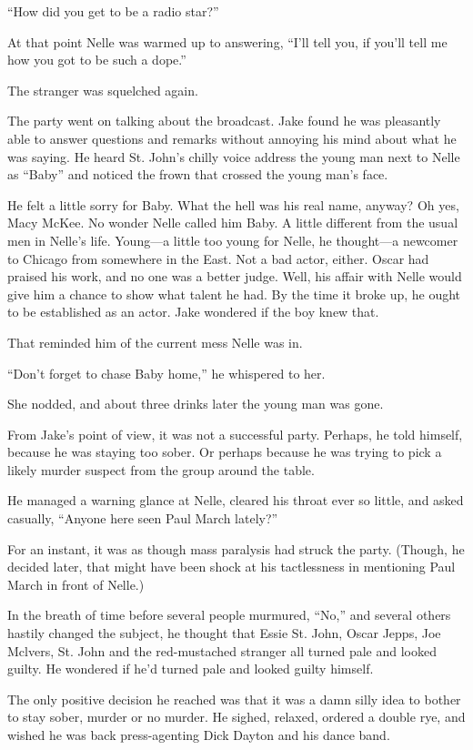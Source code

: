 \documentclass{novel}
\begin{document}
“How did you get to be a radio star?”

At that point Nelle was warmed up to answering, “I’ll tell you, if you’ll tell me how you got to be such a dope.”

The stranger was squelched again.

The party went on talking about the broadcast. Jake found he was pleasantly able to answer questions and remarks without annoying his mind about what he was saying. He heard St. John’s chilly voice address the young man next to Nelle as “Baby” and noticed the frown that crossed the young man’s face.

He felt a little sorry for Baby. What the hell was his real name, anyway? Oh yes, Macy McKee. No wonder Nelle called him Baby. A little different from the usual men in Nelle’s life. Young—a little too young for Nelle, he thought—a newcomer to Chicago from somewhere in the East. Not a bad actor, either. Oscar had praised his work, and no one was a better judge. Well, his affair with Nelle would give him a chance to show what talent he had. By the time it broke up, he ought to be established as an actor. Jake wondered if the boy knew that.

That reminded him of the current mess Nelle was in.

“Don’t forget to chase Baby home,” he whispered to her.

She nodded, and about three drinks later the young man was gone.

From Jake’s point of view, it was not a successful party. Perhaps, he told himself, because he was staying too sober. Or perhaps because he was trying to pick a likely murder suspect from the group around the table.

He managed a warning glance at Nelle, cleared his throat ever so little, and asked casually, “Anyone here seen Paul March lately?”

For an instant, it was as though mass paralysis had struck the party. (Though, he decided later, that might have been shock at his tactlessness in mentioning Paul March in front of Nelle.)

In the breath of time before several people murmured, “No,” and several others hastily changed the subject, he thought that Essie St. John, Oscar Jepps, Joe Mclvers, St. John and the red-mustached stranger all turned pale and looked guilty. He wondered if he’d turned pale and looked guilty himself.

The only positive decision he reached was that it was a damn silly idea to bother to stay sober, murder or no murder. He sighed, relaxed, ordered a double rye, and wished he was back press-agenting Dick Dayton and his dance band.
\end{document}

